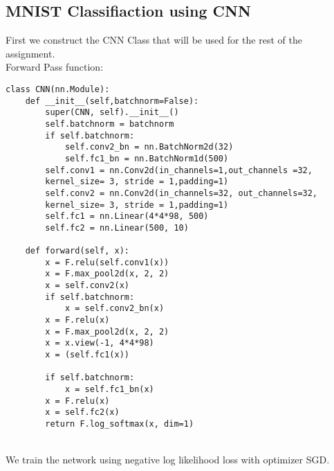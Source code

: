 \documentclass[11pt, a4paper]{article}
\begin{document}
\subsection{MNIST Classifiaction using CNN}
First we construct the CNN Class that will be used for the rest of the assignment.
\\
Forward Pass function:
\begin{verbatim}
class CNN(nn.Module):
    def __init__(self,batchnorm=False):
        super(CNN, self).__init__()
        self.batchnorm = batchnorm
        if self.batchnorm:
            self.conv2_bn = nn.BatchNorm2d(32)
            self.fc1_bn = nn.BatchNorm1d(500)
        self.conv1 = nn.Conv2d(in_channels=1,out_channels =32,
        kernel_size= 3, stride = 1,padding=1)
        self.conv2 = nn.Conv2d(in_channels=32, out_channels=32,
        kernel_size= 3, stride = 1,padding=1)
        self.fc1 = nn.Linear(4*4*98, 500)
        self.fc2 = nn.Linear(500, 10)

    def forward(self, x):
        x = F.relu(self.conv1(x))
        x = F.max_pool2d(x, 2, 2)
        x = self.conv2(x)
        if self.batchnorm:
            x = self.conv2_bn(x)
        x = F.relu(x)
        x = F.max_pool2d(x, 2, 2)
        x = x.view(-1, 4*4*98)
        x = (self.fc1(x))

        if self.batchnorm:
            x = self.fc1_bn(x)
        x = F.relu(x)
        x = self.fc2(x)
        return F.log_softmax(x, dim=1)

\end{verbatim}
\\
We train the network using negative log likelihood loss with optimizer SGD.
\end{document}
